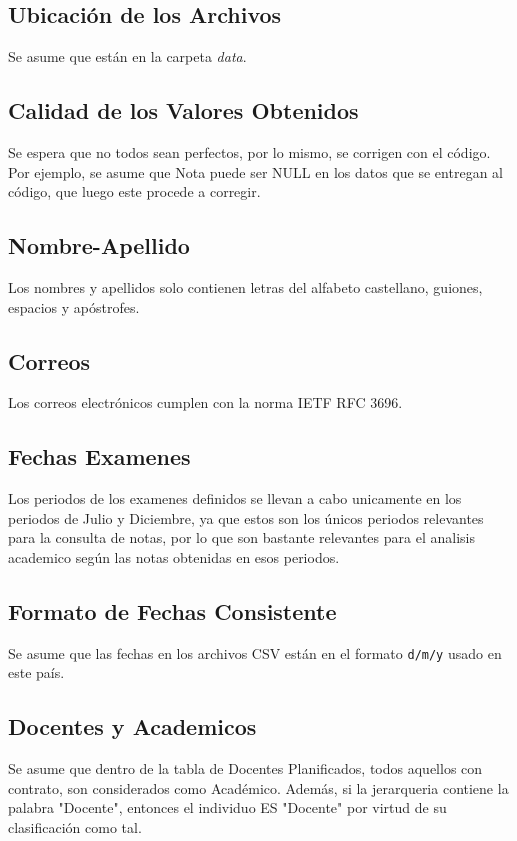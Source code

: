 \documentclass[12pt]{article}
\begin{document}
\subsection*{Ubicación de los Archivos}
Se asume que están en la carpeta \textit{data}.

\subsection*{Calidad de los Valores Obtenidos}
Se espera que no todos sean perfectos, por lo mismo, se corrigen con el código. Por ejemplo, se asume que Nota puede ser NULL en los datos que se entregan al código, que luego este procede a corregir. 

\subsection*{Nombre-Apellido}
Los nombres y apellidos solo contienen letras del alfabeto castellano, guiones, espacios y apóstrofes.

\subsection*{Correos}
Los correos electrónicos cumplen con la norma IETF RFC 3696.

\subsection*{Fechas Examenes}
Los periodos de los examenes definidos se llevan a cabo unicamente en los periodos de Julio y Diciembre, ya que estos son los únicos periodos relevantes para la consulta de notas, por lo que son bastante relevantes para el analisis academico según las notas obtenidas en esos periodos.

\subsection*{Formato de Fechas Consistente}
Se asume que las fechas en los archivos CSV están en el formato \texttt{d/m/y} usado en este país.

\subsection*{Docentes y Academicos}
Se asume que dentro de la tabla de Docentes Planificados, todos aquellos con contrato, son considerados como Académico. Además, si la jerarqueria contiene la palabra "Docente", entonces el individuo ES "Docente" por virtud de su clasificación como tal.  
\end{document}
